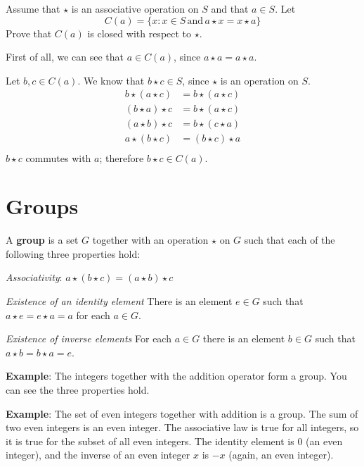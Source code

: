 \documentclass{exam}
\newcommand{\?}{\stackrel{?}{=}}
\begin{document}
\begin{questions}
	\question 
	Assume that $\star$ is an associative operation on $S$ and that $a \in S$. Let
		\[ C(a) = \{x: x \in S \,\mathrm{and}\, a \star x = x \star a\} \]
	Prove that $C(a)$ is closed with respect to $\star$.
	\begin{solution}
		First of all, we can see that $a \in C(a)$, since $a \star a = a \star a$.

		Let $b, c \in C(a)$. We know that $b \star c \in S$, since $\star$ is an operation on $S$.
		\begin{align*}
			b \star (a \star c) &= b \star (a \star c) \\
			(b \star a) \star c &= b \star (a \star c) \\
			(a \star b) \star c &= b \star (c \star a) \\
			a \star (b \star c) &= (b \star c) \star a \\
		\end{align*}
		$b \star c$ commutes with $a$; therefore $b \star c \in C(a)$.
	\end{solution}

	\section*{Groups}

	\begin{mdframed}
		A \textbf{group} is a set $G$ together with an operation $\star$ on $G$ such
		that each of the following three properties hold:
		
		\textit{Associativity}: $ a \star (b \star c) = (a \star b) \star c $
		
		\textit{Existence of an identity element}
			There is an element $e \in G$ such that $a \star e = e \star a = a$ for
			each $a \in G$.
		
		\textit{Existence of inverse elements}
			For each $a \in G$ there is an element $b \in G$ such that $a \star b =
			b \star a = e$.
		
		\textbf{Example}: The integers together with the addition operator form
		a group. You can see the three properties hold.

		\textbf{Example}: The set of even integers together with addition is a
		group. The sum of two even integers is an even integer. The associative law
		is true for all integers, so it is true for the subset of all even integers.
		The identity element is $0$ (an even integer), and the inverse of an even
		integer $x$ is $-x$ (again, an even integer).


\end{mdframed}
\end{questions}
\end{document}
